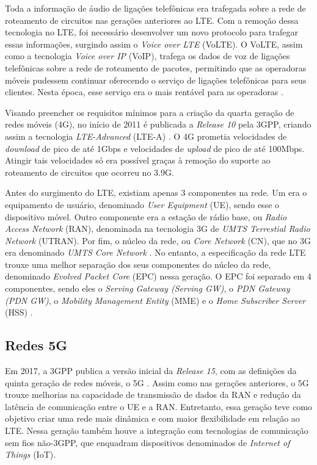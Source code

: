 Toda a informação de áudio de ligações telefônicas era trafegada sobre a rede de roteamento de circuitos nas gerações anteriores ao LTE.
Com a remoção dessa tecnologia no LTE, foi necessário desenvolver um novo protocolo para trafegar essas informações, surgindo assim o \textit{Voice over LTE} (VoLTE).
O VoLTE, assim como a tecnologia \textit{Voice over IP} (VoIP), trafega os dados de voz de ligações telefônicas sobre a rede de roteamento de pacotes, permitindo que as operadoras móveis pudessem continuar oferecendo o serviço de ligações telefônicas para seus clientes. Nesta época, esse serviço era o mais rentável para as operadoras \cite{Yi2012}. 

Visando preencher os requisitos mínimos para a criação da quarta geração de redes móveis (4G), no início de 2011 é publicada a \textit{Release 10} pela 3GPP, criando assim a tecnologia \textit{LTE-Advanced} (LTE-A) \cite{release103gpp}.
O 4G prometia velocidades de \textit{download} de pico de até 1Gbps e velocidades de \textit{upload} de pico de até 100Mbps.
Atingir tais velocidades só era possível graças à remoção do suporte ao roteamento de circuitos que ocorreu no 3.9G.

Antes do surgimento do LTE, existiam apenas 3 componentes na rede. Um era o equipamento de usuário, denominado \textit{User Equipment} (UE), sendo esse o dispositivo móvel. Outro componente era a estação de rádio base, ou \textit{Radio Access Network} (RAN), denominada na tecnologia 3G de \textit{UMTS Terrestial Radio Network} (UTRAN). Por fim, o núcleo da rede, ou \textit{Core Network} (CN), que no 3G era denominado \textit{UMTS Core Network} \cite{Miah2002}.
No entanto, a especificação da rede LTE trouxe uma melhor separação dos seus componentes do núcleo da rede, denominado \textit{Evolved Packet Core} (EPC) nessa geração.
O EPC foi separado em 4 componentes, sendo eles o \textit{Serving Gateway (Serving GW)}, o \textit{PDN Gateway (PDN GW)}, o \textit{Mobility Management Entity} (MME) e o \textit{Home Subscriber Server} (HSS) \cite{epc3gpp}.

\subsection{Redes 5G}

Em 2017, a 3GPP publica a versão inicial da \textit{Release 15}, com as definições da quinta geração de redes móveis, o 5G \cite{release153gpp}.
Assim como nas gerações anteriores, o 5G trouxe melhorias na capacidade de transmissão de dados da RAN e redução da latência de comunicação entre o UE e a RAN.
Entretanto, essa geração teve como objetivo criar uma rede mais dinâmica e com maior flexibilidade em relação ao LTE.
Nessa geração também houve a integração com tecnologias de comunicação sem fios não-3GPP, que enquadram dispositivos denominados de \textit{Internet of Things} (IoT).

